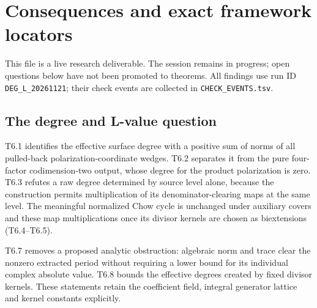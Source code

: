 \documentclass[11pt,a4paper]{article}
\theoremstyle{definition}
\begin{document}
\section{Consequences and exact framework locators}

This file is a live research deliverable. The session remains in
progress; open questions below have not been promoted to theorems. All
findings use run ID \texttt{DEG\_L\_20261121}; their check events are
collected in \texttt{CHECK\_EVENTS.tsv}.

\subsection{The degree and L-value
question}\label{IMPLICATIONS-the-degree-and-l-value-question}

T6.1 identifies the effective surface degree with a positive sum of
norms of all pulled-back polarization-coordinate wedges. T6.2 separates
it from the pure four-factor codimension-two output, whose degree for
the product polarization is zero. T6.3 refutes a raw degree determined
by source level alone, because the construction permits multiplication
of its denominator-clearing maps at the same level. The meaningful
normalized Chow cycle is unchanged under auxiliary covers and these map
multiplications once its divisor kernels are chosen as biextensions
(T6.4--T6.5).

T6.7 removes a proposed analytic obstruction: algebraic norm and trace
clear the nonzero extracted period without requiring a lower bound for
its individual complex absolute value. T6.8 bounds the effective degrees
created by fixed divisor kernels. These statements retain the
coefficient field, integral generator lattice and kernel constants
explicitly.
\end{document}
